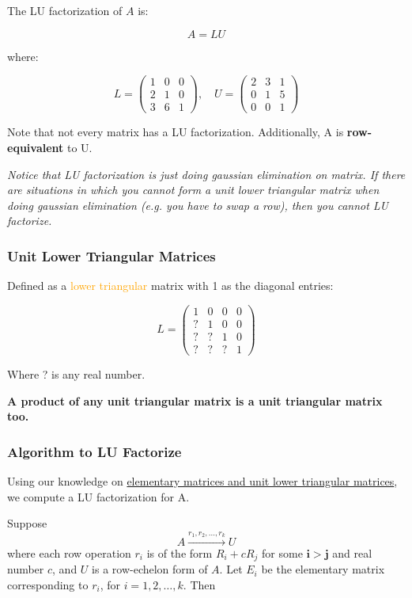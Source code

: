 \documentclass{article}
\newcommand{\sub}[1]{\vspace{10pt}\textbf{#1}}
\newcommand{\sbreak}{\vspace{10pt}}
\begin{document}
The LU factorization of \( A \) is:

\[
A = LU
\]

where:

\[
L = \begin{pmatrix}
1 & 0 & 0 \\
2 & 1 & 0 \\
3 & 6 & 1
\end{pmatrix}
,\quad
U = \begin{pmatrix}
2 & 3 & 1 \\
0 & 1 & 5 \\
0 & 0 & 1
\end{pmatrix}
\]

\break

Note that not every matrix has a LU factorization. Additionally, A is \textbf{row-equivalent} to U.

\textit{Notice that LU factorization is just doing gaussian elimination on matrix. If there are situations in which you cannot form a unit lower triangular matrix when doing gaussian elimination (e.g. you have to swap a row), then you cannot LU factorize.}
\subsubsection{Unit Lower Triangular Matrices}
\label{sec:ultm}
Defined as a \textcolor{orange}{lower triangular} matrix with 1 as the diagonal entries:

\[
L = \begin{pmatrix}
1 & 0 & 0 & 0 \\
? & 1 & 0 & 0 \\
? & ? & 1 & 0 \\
? & ? & ? & 1
\end{pmatrix}
\]
\begin{center}
    Where ? is any real number.
\end{center}

\sub{A product of any unit triangular matrix is a unit triangular matrix too.}

\subsubsection{Algorithm to LU Factorize}
Using our knowledge on \hyperref[sec:emaultm]{elementary matrices and unit lower triangular matrices}, we compute a LU factorization for A.

\sbreak

Suppose 
\[
A \overset{r_1, r_2, \dots, r_k}{\longrightarrow} U
\]
where each row operation \(r_i\) is of the form \( R_i + cR_j \) for some $\mathbf{ i > j }$ and real number \( c \), and \( U \) is a row-echelon form of \( A \). Let \( E_i \) be the elementary matrix corresponding to \( r_i \), for \( i = 1, 2, \dots, k \). Then
\end{document}

